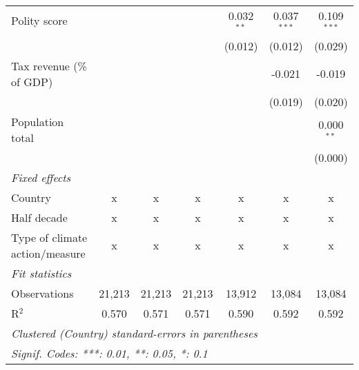 \begin{tabular}{lcccccc}
   Polity score                                                 &         &                &                & 0.032$^{**}$   & 0.037$^{***}$  & 0.109$^{***}$\\   
                                                                &         &                &                & (0.012)        & (0.012)        & (0.029)\\   
   Tax revenue (\% of GDP)                                      &         &                &                &                & -0.021         & -0.019\\   
                                                                &         &                &                &                & (0.019)        & (0.020)\\   
   Population total                                             &         &                &                &                &                & 0.000$^{**}$\\   
                                                                &         &                &                &                &                & (0.000)\\   
   \emph{Fixed effects}\\
   Country                                                      & x       & x              & x              & x              & x              & x\\  
   Half decade                                                  & x       & x              & x              & x              & x              & x\\  
   Type of climate action/measure                               & x       & x              & x              & x              & x              & x\\  
   \midrule \emph{Fit statistics}\\
   Observations                                                 & 21,213  & 21,213         & 21,213         & 13,912         & 13,084         & 13,084\\  
   R$^2$                                                        & 0.570   & 0.571          & 0.571          & 0.590          & 0.592          & 0.592\\  
   \midrule
   \multicolumn{7}{l}{\emph{Clustered (Country) standard-errors in parentheses}}\\
   \multicolumn{7}{l}{\emph{Signif. Codes: ***: 0.01, **: 0.05, *: 0.1}}\\
\end{tabular}
\par\endgroup


